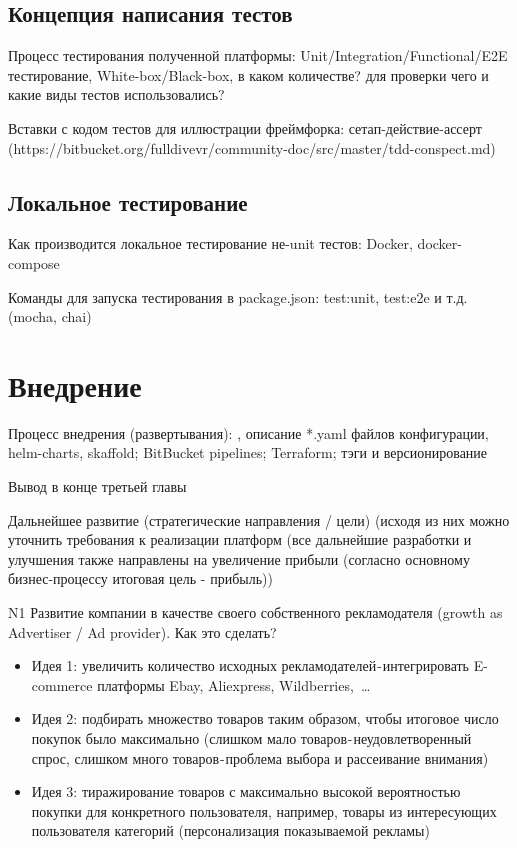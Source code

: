 \documentclass[times]{itmo-student-thesis}
\begin{document}
\subsection{Концепция написания тестов}

Процесс тестирования полученной платформы: Unit/Integration/Functional/E2E тестирование, White-box/Black-box, в каком количестве? для проверки чего и какие виды тестов использовались?

Вставки с кодом тестов для иллюстрации фреймфорка: сетап-действие-ассерт (https://bitbucket.org/fulldivevr/community-doc/src/master/tdd-conspect.md)

\subsection{Локальное тестирование}

Как производится локальное тестирование не-unit тестов: Docker, docker-compose

Команды для запуска тестирования в package.json: test:unit, test:e2e и т.д. (mocha, chai)

\section{Внедрение}

Процесс внедрения (развертывания): , описание *.yaml файлов конфигурации, helm-charts, skaffold; BitBucket pipelines; Terraform; тэги и версионирование

\chapterconclusion

Вывод в конце третьей главы





\startconclusionpage

Дальнейшее развитие (стратегические направления / цели) (исходя из них можно уточнить требования к реализации платформ
(все дальнейшие разработки и улучшения также направлены на увеличение прибыли (согласно основному бизнес-процессу итоговая цель - прибыль))

N1 Развитие компании в качестве своего собственного рекламодателя (growth as Advertiser / Ad provider). Как это сделать?
\begin{itemize}
\item Идея 1: увеличить количество исходных рекламодателей - интегрировать E-commerce платформы Ebay, Aliexpress, Wildberries, …
\item Идея 2: подбирать множество товаров таким образом, чтобы итоговое число покупок было максимально (слишком мало товаров - неудовлетворенный спрос, слишком много товаров - проблема выбора и рассеивание внимания)
\item Идея 3: тиражирование товаров с максимально высокой вероятностью покупки для конкретного пользователя, например, товары из интересующих пользователя категорий (персонализация показываемой рекламы)
\end{itemize}
\end{document}

